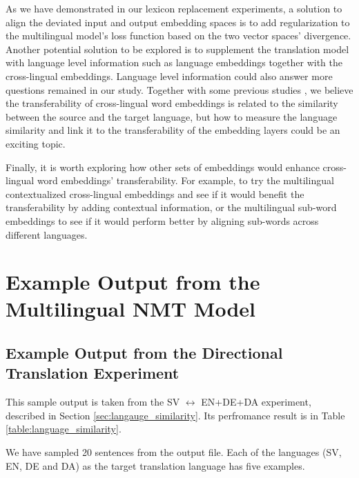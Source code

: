 \documentclass[thesis,fonts=libertine]{cluu}
\begin{document}
As we have demonstrated in our lexicon replacement experiments, a solution to align the deviated input and output embedding spaces is to add regularization to the multilingual model's loss function based on the two vector spaces' divergence. Another potential solution to be explored is to supplement the translation model with language level information such as language embeddings \parencite{littell-etal-2017-uriel,malaviya-etal-2017-learning} together with the cross-lingual embeddings. Language level information could also answer more questions remained in our study. Together with some previous studies \parencite{Qi:2018aa,aji-etal-2020-neural}, we believe the transferability of cross-lingual word embeddings is related to the similarity between the source and the target language, but how to measure the language similarity and link it to the transferability of the embedding layers could be an exciting topic.

Finally, it is worth exploring how other sets of embeddings would enhance cross-lingual word embeddings' transferability. For example, to try the multilingual contextualized cross-lingual embeddings \parencite{devlin-etal-2019-bert} and see if it would benefit the transferability by adding contextual information, or the multilingual sub-word embeddings \parencite{Heinzerling:2017aa} to see if it would perform better by aligning sub-words across different languages.

\appendix
\chapter{Example Output from the Multilingual NMT Model}
\label{chap:example_output}

\section{Example Output from the Directional Translation Experiment}
\label{sec:directional_output}

This sample output is taken from the SV $\leftrightarrow$ EN+DE+DA experiment, described in Section \ref{sec:langauge_similarity}. Its perfromance result is in Table \ref{table:language_similarity}.

We have sampled 20 sentences from the output file. Each of the languages (SV, EN, DE and DA) as the target translation language has five examples.



\printbibliography
\end{document}

